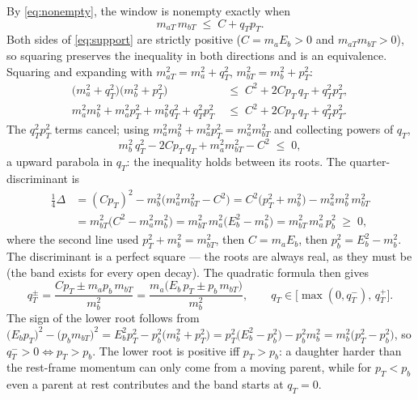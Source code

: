 \documentclass[11pt]{article}
\begin{document}
By \eqref{eq:nonempty}, the window is nonempty exactly when
\begin{equation}
m_{aT}\,m_{bT}\;\le\;C+q_Tp_T .
\label{eq:support}
\end{equation}
Both sides of \eqref{eq:support} are strictly positive ($C=m_aE_b>0$ and
$m_{aT}m_{bT}>0$), so squaring preserves the inequality in both
directions and is an equivalence.  Squaring and expanding with
$m_{aT}^2=m_a^2+q_T^2$, $m_{bT}^2=m_b^2+p_T^2$:
\begin{align}
\big(m_a^2+q_T^2\big)\big(m_b^2+p_T^2\big)
&\;\le\; C^2+2Cp_T\,q_T+q_T^2p_T^2 ,\nonumber\\
m_a^2m_b^2+m_a^2p_T^2+m_b^2q_T^2+q_T^2p_T^2
&\;\le\; C^2+2Cp_T\,q_T+q_T^2p_T^2 .
\end{align}
The $q_T^2p_T^2$ terms cancel; using $m_a^2m_b^2+m_a^2p_T^2 =
m_a^2m_{bT}^2$ and collecting powers of $q_T$,
\begin{equation}
m_b^2\,q_T^2-2Cp_T\,q_T+m_a^2m_{bT}^2-C^2\;\le\;0 ,
\label{eq:quadratic}
\end{equation}
a upward parabola in $q_T$: the inequality holds between its roots.  The
quarter-discriminant is
\begin{align}
\tfrac14\Delta
&= (Cp_T)^2-m_b^2\big(m_a^2m_{bT}^2-C^2\big)
 = C^2\big(p_T^2+m_b^2\big)-m_a^2m_b^2\,m_{bT}^2 \nonumber\\
&= m_{bT}^2\big(C^2-m_a^2m_b^2\big)
 = m_{bT}^2\,m_a^2\big(E_b^2-m_b^2\big)
 = m_{bT}^2\,m_a^2\,p_b^2\;\ge\;0 ,
\end{align}
where the second line used $p_T^2+m_b^2=m_{bT}^2$, then $C=m_aE_b$, then
$p_b^2=E_b^2-m_b^2$.  The discriminant is a perfect square --- the roots
are always real, as they must be (the band exists for every open decay).
The quadratic formula then gives
\begin{equation}
q_T^{\pm}
=\frac{Cp_T\pm m_a p_b\,m_{bT}}{m_b^{2}}
=\frac{m_a\big(E_b\,p_T\pm p_b\,m_{bT}\big)}{m_b^{2}},
\qquad
q_T\in\big[\max(0,q_T^-),\,q_T^+\big].
\label{eq:band}
\end{equation}
The sign of the lower root follows from
$\big(E_bp_T\big)^2-\big(p_bm_{bT}\big)^2
= E_b^2p_T^2-p_b^2\big(m_b^2+p_T^2\big)
= p_T^2\big(E_b^2-p_b^2\big)-p_b^2m_b^2
= m_b^2\big(p_T^2-p_b^2\big)$,
so $q_T^->0\iff p_T>p_b$.
The lower root is positive iff $p_T>p_b$: a daughter harder than the
rest-frame momentum can only come from a moving parent, while for
$p_T<p_b$ even a parent at rest contributes and the band starts at
$q_T=0$.
\end{document}
